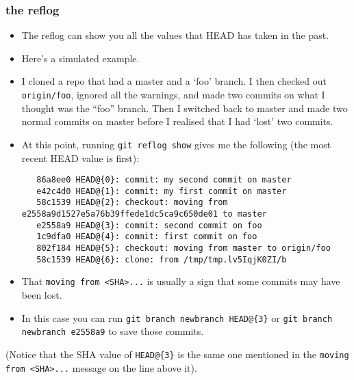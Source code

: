 \documentclass[presentation]{beamer}
\begin{document}
\begin{frame}[fragile]
\frametitle{the reflog}
\label{sec-10-7}


\tiny

\begin{itemize}
\item The reflog can show you all the values that HEAD has taken in the past.
\item Here's a simulated example.
\item I cloned a repo that had a master and a `foo'
  branch.  I then checked out \texttt{origin/foo}, ignored all the warnings, and made
  two commits on what I thought was the ``foo'' branch.  Then I switched back to
  master and made two normal commits on master before I realised that I had
  `lost' two commits.
\item At this point, running \texttt{git reflog show} gives me the following (the most
  recent HEAD value is first):

\begin{verbatim}
   86a8ee0 HEAD@{0}: commit: my second commit on master
   e42c4d0 HEAD@{1}: commit: my first commit on master
   58c1539 HEAD@{2}: checkout: moving from e2558a9d1527e5a76b39ffede1dc5ca9c650de01 to master
   e2558a9 HEAD@{3}: commit: second commit on foo
   1c9dfa0 HEAD@{4}: commit: first commit on foo
   802f184 HEAD@{5}: checkout: moving from master to origin/foo
   58c1539 HEAD@{6}: clone: from /tmp/tmp.lv5IqjK0ZI/b
\end{verbatim}
\item That \texttt{moving from <SHA>...} is usually a sign that some commits may have been
  lost.
\item In this case you can run \texttt{git branch newbranch HEAD@\{3\}} or \texttt{git branch   newbranch e2558a9} to save those commits.
\end{itemize}

(Notice that the SHA value of \texttt{HEAD@\{3\}} is the same one mentioned in
the \texttt{moving from <SHA>...} message on the line above it).
\end{frame}
\end{document}
